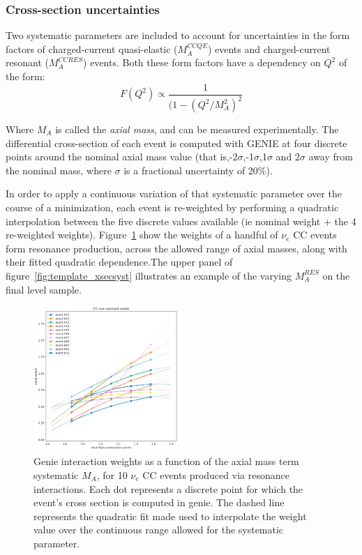 \subsubsection{Cross-section uncertainties}
\label{sec:xsec_systs}
Two systematic parameters are included to account for uncertainties in the form factors of charged-current quasi-elastic ($M_{A}^{CCQE}$) events and charged-current resonant ($M_{A}^{CCRES}$) events. Both these form factors have a dependency on $Q^2$ of the form:\\

\begin{equation}
    F(Q^{2}) \propto \frac{1}{(1-(Q^{2}/M_{A}^{2})^{2}}
\end{equation}

Where $M_{A}$ is called the \textit{axial mass}, and can be measured experimentally.  The differential cross-section of each event is computed with GENIE at four discrete points around the nominal axial mass value (that is,-2$\sigma$,-1$\sigma$,1$\sigma$ and 2$\sigma$ away from the nominal mass, where $\sigma$ is a fractional uncertainty of 20\%).

In order to apply a continuous variation of that systematic parameter over the course of a minimization, each event is re-weighted by performing a quadratic interpolation between the five discrete values available (ie nominal weight + the 4 re-weighted weights). Figure~\ref{fig:resonant_mass} show the weights of a handful of $\nu_{e}$ CC events form resonance production, across the allowed range of axial masses, along with their fitted quadratic dependence.The upper panel of figure~\ref{fig:template_xsecsyst} illustrates an example of the varying $M_{A}^{RES}$ on the final level sample.

\begin{figure}
    \centering
    \includegraphics[width=0.5\textwidth]{figures/measurement/systematics/xsec/nue_cc_res_xsec_Ma_systematic.png}
    \caption{Genie interaction weights as a function of the axial mass term systematic $M_{A}$, for 10 $\nu_{e}$ CC events produced via resonance interactions. Each dot represents a discrete point for which the event's cross section is computed in genie. The dashed line represents the quadratic fit made used to interpolate the weight value over the continuous range allowed for the systematic parameter.}
    \label{fig:resonant_mass}
\end{figure}

